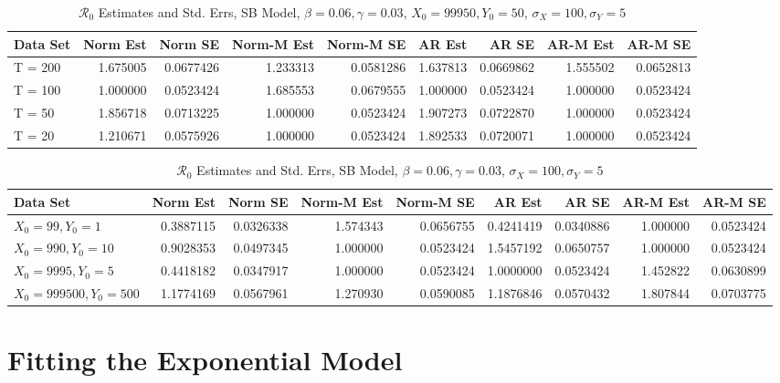 \documentclass[12pt]{article}
\newcommand{\rr}{\ensuremath{\mathcal{R}_0}}
\begin{document}
\begin{table}[H]
	
	\caption{\label{tab:}$\rr$ Estimates and Std. Errs, SB Model,
		$\beta = 0.06, \gamma = 0.03$, $X_0 = 99950, Y_0 = 50$, $\sigma_X = 100, \sigma_Y = 5$}
	\centering
	\begin{tabular}[t]{l|r|r|r|r|r|r|r|r}
		\hline
		Data Set & Norm Est & Norm SE & Norm-M Est & Norm-M SE & AR Est & AR SE & AR-M Est & AR-M SE\\
		\hline
		T = 200 & 1.675005 & 0.0677426 & 1.233313 & 0.0581286 & 1.637813 & 0.0669862 & 1.555502 & 0.0652813\\
		\hline
		T = 100 & 1.000000 & 0.0523424 & 1.685553 & 0.0679555 & 1.000000 & 0.0523424 & 1.000000 & 0.0523424\\
		\hline
		T = 50 & 1.856718 & 0.0713225 & 1.000000 & 0.0523424 & 1.907273 & 0.0722870 & 1.000000 & 0.0523424\\
		\hline
		T = 20 & 1.210671 & 0.0575926 & 1.000000 & 0.0523424 & 1.892533 & 0.0720071 & 1.000000 & 0.0523424\\
		\hline
	\end{tabular}
\end{table}

\begin{table}[H]
	
	\caption{\label{tab:}$\rr$ Estimates and Std. Errs, SB Model,
		$\beta = 0.06, \gamma = 0.03$, $\sigma_X = 100, \sigma_Y = 5$}
	\centering
	\begin{tabular}[t]{l|r|r|r|r|r|r|r|r}
		\hline
		Data Set & Norm Est & Norm SE & Norm-M Est & Norm-M SE & AR Est & AR SE & AR-M Est & AR-M SE\\
		\hline
		$X_0 = 99, Y_0 = 1$ & 0.3887115 & 0.0326338 & 1.574343 & 0.0656755 & 0.4241419 & 0.0340886 & 1.000000 & 0.0523424\\
		\hline
		$X_0 = 990, Y_0 = 10$ & 0.9028353 & 0.0497345 & 1.000000 & 0.0523424 & 1.5457192 & 0.0650757 & 1.000000 & 0.0523424\\
		\hline
		$X_0 = 9995, Y_0 = 5$ & 0.4418182 & 0.0347917 & 1.000000 & 0.0523424 & 1.0000000 & 0.0523424 & 1.452822 & 0.0630899\\
		\hline
		$X_0 = 999500, Y_0 = 500$ & 1.1774169 & 0.0567961 & 1.270930 & 0.0590085 & 1.1876846 & 0.0570432 & 1.807844 & 0.0703775\\
		\hline
	\end{tabular}
\end{table}

\section{Fitting the Exponential Model}
\end{document}

